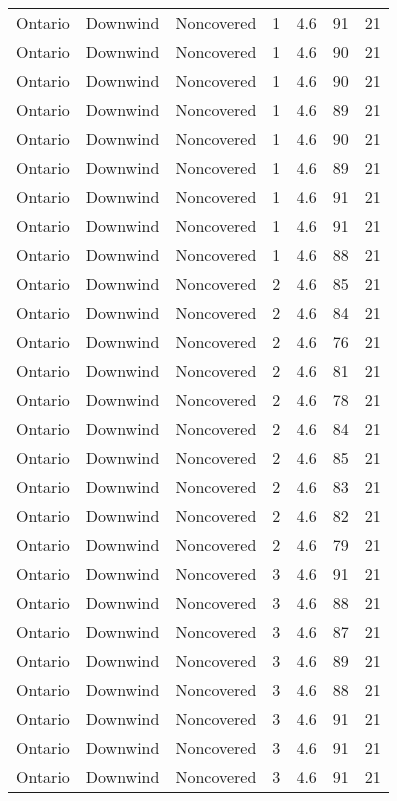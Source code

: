\documentclass{article}
\begin{document}
\begin{longtable}[H]{ccccccc}
Ontario & Downwind & Noncovered & 1 & 4.6  & 91  & 21 \\
Ontario & Downwind & Noncovered & 1 & 4.6  & 90  & 21 \\
Ontario & Downwind & Noncovered & 1 & 4.6  & 90  & 21 \\
Ontario & Downwind & Noncovered & 1 & 4.6  & 89  & 21 \\
Ontario & Downwind & Noncovered & 1 & 4.6  & 90  & 21 \\
Ontario & Downwind & Noncovered & 1 & 4.6  & 89  & 21 \\
Ontario & Downwind & Noncovered & 1 & 4.6  & 91  & 21 \\
Ontario & Downwind & Noncovered & 1 & 4.6  & 91  & 21 \\
Ontario & Downwind & Noncovered & 1 & 4.6  & 88  & 21 \\
Ontario & Downwind & Noncovered & 2 & 4.6  & 85  & 21 \\
Ontario & Downwind & Noncovered & 2 & 4.6  & 84  & 21 \\
Ontario & Downwind & Noncovered & 2 & 4.6  & 76  & 21 \\
Ontario & Downwind & Noncovered & 2 & 4.6  & 81  & 21 \\
Ontario & Downwind & Noncovered & 2 & 4.6  & 78  & 21 \\
Ontario & Downwind & Noncovered & 2 & 4.6  & 84  & 21 \\
Ontario & Downwind & Noncovered & 2 & 4.6  & 85  & 21 \\
Ontario & Downwind & Noncovered & 2 & 4.6  & 83  & 21 \\
Ontario & Downwind & Noncovered & 2 & 4.6  & 82  & 21 \\
Ontario & Downwind & Noncovered & 2 & 4.6  & 79  & 21 \\
Ontario & Downwind & Noncovered & 3 & 4.6  & 91  & 21 \\
Ontario & Downwind & Noncovered & 3 & 4.6  & 88  & 21 \\
Ontario & Downwind & Noncovered & 3 & 4.6  & 87  & 21 \\
Ontario & Downwind & Noncovered & 3 & 4.6  & 89  & 21 \\
Ontario & Downwind & Noncovered & 3 & 4.6  & 88  & 21 \\
Ontario & Downwind & Noncovered & 3 & 4.6  & 91  & 21 \\
Ontario & Downwind & Noncovered & 3 & 4.6  & 91  & 21 \\
Ontario & Downwind & Noncovered & 3 & 4.6  & 91  & 21 \\

\end{longtable}
\end{document}
